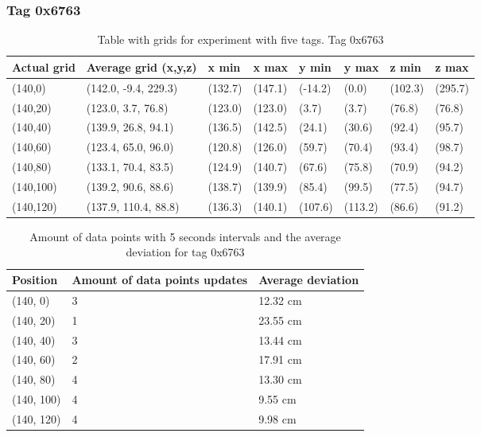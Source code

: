 \subsubsection{Tag 0x6763}
\begin{table}[H]
    \centering
    \begin{tabular}{|l|l|l|l|l|l|l|l|}
        \hline
        Actual grid & Average grid (x,y,z) & x min   & x max   & y min   & y max   & z min   & z max   \\ \hline
        (140,0)     & (142.0, -9.4, 229.3) & (132.7) & (147.1) & (-14.2) & (0.0)   & (102.3) & (295.7) \\ \hline
        (140,20)    & (123.0, 3.7, 76.8)   & (123.0) & (123.0) & (3.7)   & (3.7)   & (76.8)  & (76.8)  \\ \hline
        (140,40)    & (139.9, 26.8, 94.1)  & (136.5) & (142.5) & (24.1)  & (30.6)  & (92.4)  & (95.7)  \\ \hline
        (140,60)    & (123.4, 65.0, 96.0)  & (120.8) & (126.0) & (59.7)  & (70.4)  & (93.4)  & (98.7)  \\ \hline
        (140,80)    & (133.1, 70.4, 83.5)  & (124.9) & (140.7) & (67.6)  & (75.8)  & (70.9)  & (94.2)  \\ \hline
        (140,100)   & (139.2, 90.6, 88.6)  & (138.7) & (139.9) & (85.4)  & (99.5)  & (77.5)  & (94.7)  \\ \hline
        (140,120)   & (137.9, 110.4, 88.8) & (136.3) & (140.1) & (107.6) & (113.2) & (86.6)  & (91.2)  \\ \hline
    \end{tabular}
    \caption{Table with grids for experiment with five tags. Tag 0x6763}
\end{table}

\begin{table}[H]
    \centering
    \begin{tabular}{|l|l|l|}
        \hline
        Position   & Amount of data points updates & Average deviation \\ \hline
        (140, 0)   & 3                             & 12.32 cm          \\ \hline
        (140, 20)  & 1                             & 23.55 cm          \\ \hline
        (140, 40)  & 3                             & 13.44 cm          \\ \hline
        (140, 60)  & 2                             & 17.91 cm          \\ \hline
        (140, 80)  & 4                             & 13.30 cm          \\ \hline
        (140, 100) & 4                             & 9.55 cm           \\ \hline
        (140, 120) & 4                             & 9.98 cm           \\ \hline
    \end{tabular}
    \caption{Amount of data points with 5 seconds intervals and the average deviation for tag 0x6763}
\end{table}


